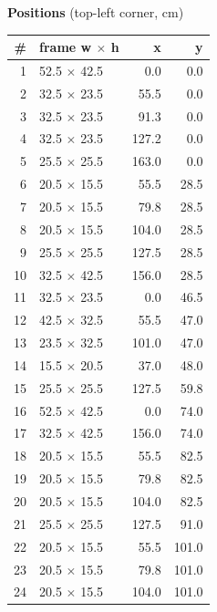 \documentclass[a4paper,landscape,10pt]{article}
\begin{document}
\begin{minipage}[t]{0.25\textwidth}
\vspace{8pt}
{\bfseries Positions} (top-left corner, cm)\\[2pt]
\tiny
\begin{tabular}{@{}r l r r@{}}
\toprule
\# & frame w $\times$ h & x & y \\
\midrule
1 & 52.5 $\times$ 42.5 & 0.0 & 0.0 \\
2 & 32.5 $\times$ 23.5 & 55.5 & 0.0 \\
3 & 32.5 $\times$ 23.5 & 91.3 & 0.0 \\
4 & 32.5 $\times$ 23.5 & 127.2 & 0.0 \\
5 & 25.5 $\times$ 25.5 & 163.0 & 0.0 \\
6 & 20.5 $\times$ 15.5 & 55.5 & 28.5 \\
7 & 20.5 $\times$ 15.5 & 79.8 & 28.5 \\
8 & 20.5 $\times$ 15.5 & 104.0 & 28.5 \\
9 & 25.5 $\times$ 25.5 & 127.5 & 28.5 \\
10 & 32.5 $\times$ 42.5 & 156.0 & 28.5 \\
11 & 32.5 $\times$ 23.5 & 0.0 & 46.5 \\
12 & 42.5 $\times$ 32.5 & 55.5 & 47.0 \\
13 & 23.5 $\times$ 32.5 & 101.0 & 47.0 \\
14 & 15.5 $\times$ 20.5 & 37.0 & 48.0 \\
15 & 25.5 $\times$ 25.5 & 127.5 & 59.8 \\
16 & 52.5 $\times$ 42.5 & 0.0 & 74.0 \\
17 & 32.5 $\times$ 42.5 & 156.0 & 74.0 \\
18 & 20.5 $\times$ 15.5 & 55.5 & 82.5 \\
19 & 20.5 $\times$ 15.5 & 79.8 & 82.5 \\
20 & 20.5 $\times$ 15.5 & 104.0 & 82.5 \\
21 & 25.5 $\times$ 25.5 & 127.5 & 91.0 \\
22 & 20.5 $\times$ 15.5 & 55.5 & 101.0 \\
23 & 20.5 $\times$ 15.5 & 79.8 & 101.0 \\
24 & 20.5 $\times$ 15.5 & 104.0 & 101.0 \\
\bottomrule
\end{tabular}
\end{minipage}
\clearpage
\end{document}
